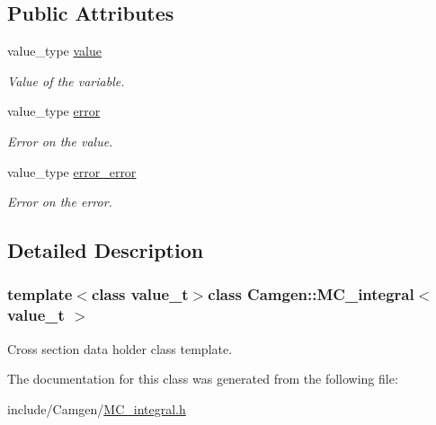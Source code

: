 \subsection*{Public Attributes}
\begin{DoxyCompactItemize}
\item 
\hypertarget{a00368_af157bc06b6f02f9b493d55b2e3ed15fc}{}value\+\_\+type \hyperlink{a00368_af157bc06b6f02f9b493d55b2e3ed15fc}{value}\label{a00368_af157bc06b6f02f9b493d55b2e3ed15fc}

\begin{DoxyCompactList}\small\item\em Value of the variable. \end{DoxyCompactList}\item 
\hypertarget{a00368_a58f93d53de2819a07d63c2f69a512536}{}value\+\_\+type \hyperlink{a00368_a58f93d53de2819a07d63c2f69a512536}{error}\label{a00368_a58f93d53de2819a07d63c2f69a512536}

\begin{DoxyCompactList}\small\item\em Error on the value. \end{DoxyCompactList}\item 
\hypertarget{a00368_a56de2f410ea5d3702790a2c65b89f858}{}value\+\_\+type \hyperlink{a00368_a56de2f410ea5d3702790a2c65b89f858}{error\+\_\+error}\label{a00368_a56de2f410ea5d3702790a2c65b89f858}

\begin{DoxyCompactList}\small\item\em Error on the error. \end{DoxyCompactList}\end{DoxyCompactItemize}


\subsection{Detailed Description}
\subsubsection*{template$<$class value\+\_\+t$>$class Camgen\+::\+M\+C\+\_\+integral$<$ value\+\_\+t $>$}

Cross section data holder class template. 

The documentation for this class was generated from the following file\+:\begin{DoxyCompactItemize}
\item 
include/\+Camgen/\hyperlink{a00694}{M\+C\+\_\+integral.\+h}\end{DoxyCompactItemize}

